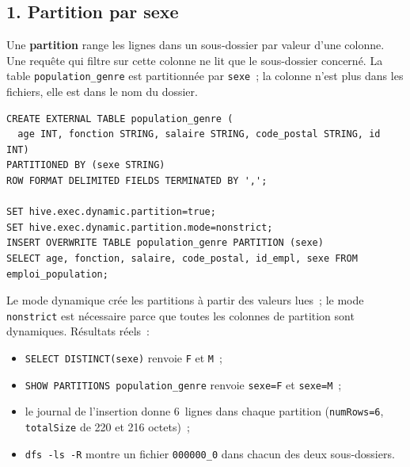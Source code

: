 \subsection*{1. Partition par sexe}
{}

\noindent Une \textbf{partition} range les lignes dans un sous-dossier par valeur d'une colonne. Une requête qui filtre sur cette colonne ne lit que le sous-dossier concerné. La table \texttt{population\_genre} est partitionnée par \texttt{sexe}~; la colonne n'est plus dans les fichiers, elle est dans le nom du dossier.

\begin{verbatim}
CREATE EXTERNAL TABLE population_genre (
  age INT, fonction STRING, salaire STRING, code_postal STRING, id INT)
PARTITIONED BY (sexe STRING)
ROW FORMAT DELIMITED FIELDS TERMINATED BY ',';

SET hive.exec.dynamic.partition=true;
SET hive.exec.dynamic.partition.mode=nonstrict;
INSERT OVERWRITE TABLE population_genre PARTITION (sexe)
SELECT age, fonction, salaire, code_postal, id_empl, sexe FROM emploi_population;
\end{verbatim}

\noindent Le mode dynamique crée les partitions à partir des valeurs lues~; le mode \texttt{nonstrict} est nécessaire parce que toutes les colonnes de partition sont dynamiques. Résultats réels~:

\begin{itemize}
	\item \texttt{SELECT DISTINCT(sexe)} renvoie \texttt{F} et \texttt{M}~;
	\item \texttt{SHOW PARTITIONS population\_genre} renvoie \texttt{sexe=F} et \texttt{sexe=M}~;
	\item le journal de l'insertion donne 6~lignes dans chaque partition (\texttt{numRows=6}, \texttt{totalSize} de 220 et 216 octets)~;
	\item \texttt{dfs -ls -R} montre un fichier \texttt{000000\_0} dans chacun des deux sous-dossiers.
\end{itemize}

